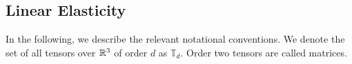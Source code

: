 \subsection{Linear Elasticity}\label{subsec:linearelasicity}
In the following, we describe the relevant notational conventions.
We denote the set of all tensors over $\mathbb{R}^3$ of order $d$ as $\mathbb{T}_d$. Order two tensors are called matrices.%

